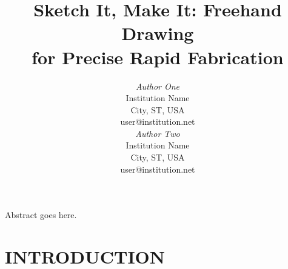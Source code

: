 \documentclass{article}
\begin{document}

\toappear{}



\title{Sketch It, Make It: Freehand Drawing\\
for Precise Rapid Fabrication}

\author{
\parbox[t]{9cm}{\centering
	     {\em Author One}\\
	     Institution Name\\
             City, ST, USA\\
	     user@institution.net}
\parbox[t]{9cm}{\centering
	     {\em Author Two}\\
	     Institution Name\\
             City, ST, USA\\
	     user@institution.net}
}

\maketitle

\abstract Abstract goes here. 






\section{INTRODUCTION}
\end{document}
